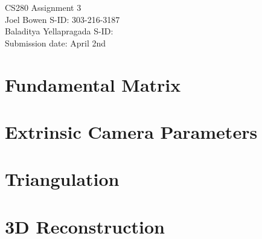 \documentclass{article}
\begin{document}
\noindent CS280 Assignment 3 \\
\noindent Joel Bowen S-ID: 303-216-3187 \\
\noindent Baladitya Yellapragada S-ID: \\
\noindent Submission date: April 2nd

\section{Fundamental Matrix}


\section{Extrinsic Camera Parameters}


\section{Triangulation}


\section{3D Reconstruction}

\end{document}
